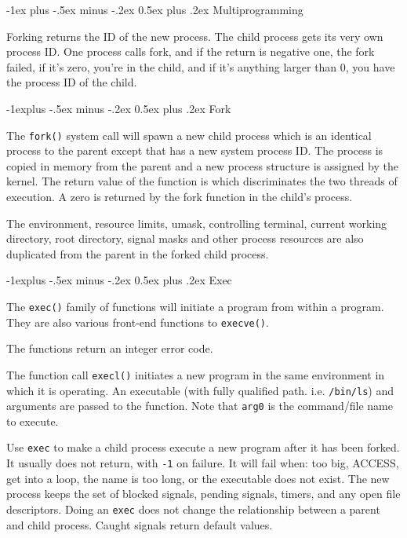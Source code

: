 \documentclass[10pt,landscape, a4paper]{article}
\makeatletter
\renewcommand{\section}{\@startsection{section}{1}{0mm}%
                                {-1ex plus -.5ex minus -.2ex}%
                                {0.5ex plus .2ex}%
                                {\normalfont\large\bfseries}}
\renewcommand{\subsection}{\@startsection{subsection}{2}{0mm}%
                                {-1explus -.5ex minus -.2ex}%
                                {0.5ex plus .2ex}%
                                {\normalfont\normalsize\bfseries}}
\makeatother
\begin{document}
\begin{multicols}{3}


\section{Multiprogramming}

Forking returns the ID of the new process. The child process gets its
very own process ID. One process calls fork, and if the return is negative
one, the fork failed, if it's zero, you're in the child, and if it's anything
larger than 0, you have the process ID of the child.

\subsection{Fork}

The \texttt{fork()} system call will spawn a new child process which is an 
identical process to the parent except that has a new system process ID. 
The process is copied in memory from the parent and a new process structure 
is assigned by the kernel. The return value of the function is which 
discriminates the two threads of execution. A zero is returned by the 
fork function in the child's process.

The environment, resource limits, umask, controlling terminal, 
current working directory, root directory, signal masks and other 
process resources are also duplicated from the parent in the forked 
child process.



\subsection{Exec}

The \texttt{exec()} family of functions will initiate a program from within a program. 
They are also various front-end functions to \texttt{execve()}.

The functions return an integer error code.

The function call \texttt{execl()} initiates a new program in the same environment 
in which it is operating. An executable (with fully qualified path. i.e. \texttt{/bin/ls}) 
and arguments are passed to the function. Note that \texttt{arg0} is the command/file 
name to execute.

Use \texttt{exec} to make a child process execute a new program
after it has been forked. It usually does not return, with \texttt{-1}
on failure. It will fail when: too big, ACCESS, get into a loop, the name
is too long, or the executable does not exist. The new process keeps the
set of blocked signals, pending signals, timers, and any open file 
descriptors. Doing an \texttt{exec} does not change the relationship
between a parent and child process. Caught signals return default values.


\end{multicols}
\end{document}
